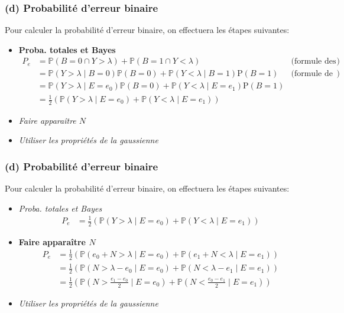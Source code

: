 \documentclass[11pt]{article}
\begin{document}
    \hypertarget{d-probabilituxe9-derreur-binaire}{%
\subsubsection{(d) Probabilité d'erreur
binaire}\label{d-probabilituxe9-derreur-binaire}}

Pour calculer la probabilité d'erreur binaire, on effectuera les étapes
suivantes:

\begin{itemize}
\item
  \textbf{Proba. totales et Bayes} \begin{align}
    P_e &= \mathbb{P}(B=0 \cap Y>\lambda)+\mathbb{P}(B=1 \cap Y<\lambda)&\text{(formule des probabilités totales})\\
        &= \mathbb{P}(Y>\lambda \mid B=0) \mathbb{P}(B=0)+\mathbb{P}(Y<\lambda \mid B=1) \mathrm{P}(B=1) &\text{(formule de Bayes})\\
        &= \mathbb{P}(Y>\lambda \mid E=e_0) \mathbb{P}(B=0)+\mathbb{P}(Y<\lambda \mid E=e_1) \mathrm{P}(B=1)\\
        &= \frac{1}{2}\left(\mathbb{P}\left(Y>\lambda \mid E=e_0\right) + \mathbb{P}\left(Y<\lambda \mid E=e_1\right)\right)
  \end{align}
\item
  \emph{Faire apparaître \(N\)}
\item
  \emph{Utiliser les propriétés de la gaussienne}
\end{itemize}

    \hypertarget{d-probabilituxe9-derreur-binaire}{%
\subsubsection{(d) Probabilité d'erreur
binaire}\label{d-probabilituxe9-derreur-binaire}}

Pour calculer la probabilité d'erreur binaire, on effectuera les étapes
suivantes:

\begin{itemize}
\item
  \emph{Proba. totales et Bayes} \begin{align}
    P_e &= \frac{1}{2}\left(\mathbb{P}\left(Y>\lambda \mid E=e_0\right) + \mathbb{P}\left(Y<\lambda \mid E=e_1\right)\right)
  \end{align}
\item
  \textbf{Faire apparaître \(N\)} \begin{align}
     P_e &= \frac{1}{2}\left(\mathbb{P}\left(e_0 + N>\lambda \mid E=e_0\right) + \mathbb{P}\left(e_1 + N<\lambda \mid E=e_1\right)\right)\\
        &= \frac{1}{2}\left(\mathbb{P}\left(N>\lambda-e_0 \mid E=e_0\right) + \mathbb{P}\left(N<\lambda-e_1 \mid E=e_1\right)\right)\\
        &= \frac{1}{2}\left(\mathbb{P}\left(N>\frac{e_1-e_0}{2} \mid E=e_0\right) + \mathbb{P}\left(N<\frac{e_0-e_1}{2} \mid E=e_1\right)\right)
  \end{align}
\item
  \emph{Utiliser les propriétés de la gaussienne}
\end{itemize}
\end{document}
